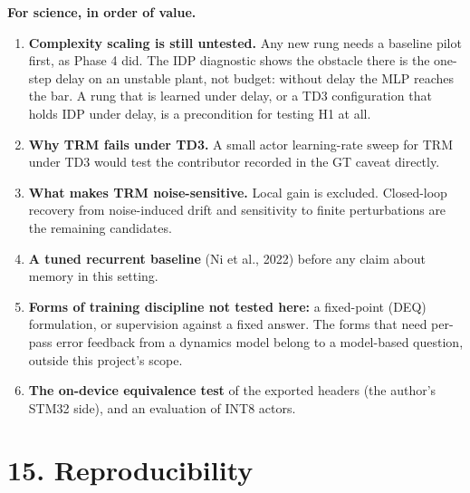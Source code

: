 \documentclass[11pt]{article}
\begin{document}
\textbf{For science, in order of value.}

\begin{enumerate}
\item \textbf{Complexity scaling is still untested.} Any new rung needs a baseline pilot first, as Phase 4 did. The IDP diagnostic shows the obstacle there is the one-step delay on an unstable plant, not budget: without delay the MLP reaches the bar. A rung that is learned under delay, or a TD3 configuration that holds IDP under delay, is a precondition for testing H1 at all.
\item \textbf{Why TRM fails under TD3.} A small actor learning-rate sweep for TRM under TD3 would test the contributor recorded in the GT caveat directly.
\item \textbf{What makes TRM noise-sensitive.} Local gain is excluded. Closed-loop recovery from noise-induced drift and sensitivity to finite perturbations are the remaining candidates.
\item \textbf{A tuned recurrent baseline} (Ni et al., 2022) before any claim about memory in this setting.
\item \textbf{Forms of training discipline not tested here:} a fixed-point (DEQ) formulation, or supervision against a fixed answer. The forms that need per-pass error feedback from a dynamics model belong to a model-based question, outside this project's scope.
\item \textbf{The on-device equivalence test} of the exported headers (the author's STM32 side), and an evaluation of INT8 actors.
\end{enumerate}



\medskip



\section*{15. Reproducibility}
\end{document}
